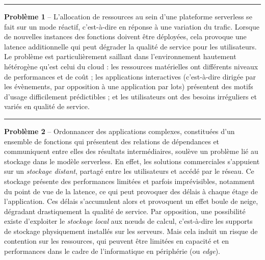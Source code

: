 \begin{center}
    \rule{4cm}{0.4pt}
\end{center}

\textbf{Problème 1} -- L'allocation de ressources au sein d'une plateforme serverless se fait sur un mode réactif, c'est-à-dire en réponse à une variation du trafic. Lorsque de nouvelles instances des fonctions doivent être déployées, cela provoque une latence additionnelle qui peut dégrader la qualité de service pour les utilisateurs. Le problème est particulièrement saillant dans l'environnement hautement hétérogène qu'est celui du cloud : les ressources matérielles ont différents niveaux de performances et de coût ; les applications interactives (c'est-à-dire dirigée par les évènements, par opposition à une application par lots) présentent des motifs d'usage difficilement prédictibles ; et les utilisateurs ont des besoins irréguliers et variés en qualité de service.


\begin{center}
    \rule{4cm}{0.4pt}
\end{center}

\textbf{Problème 2} -- Ordonnancer des applications complexes, constituées d'un ensemble de fonctions qui présentent des relations de dépendances et communiquent entre elles des résultats intermédiaires, soulève un problème lié au stockage dans le modèle serverless. En effet, les solutions commerciales s'appuient sur un \textit{stockage distant}, partagé entre les utilisateurs et accédé par le réseau. Ce stockage présente des performances limitées et parfois imprévisibles, notamment du point de vue de la latence, ce qui peut provoquer des délais à chaque étage de l'application. Ces délais s'accumulent alors et provoquent un effet boule de neige, dégradant drastiquement la qualité de service. Par opposition, une possibilité existe d'exploiter le \textit{stockage local} aux nœuds de calcul, c'est-à-dire les supports de stockage physiquement installés sur les serveurs. Mais cela induit un risque de contention sur les ressources, qui peuvent être limitées en capacité et en performances dans le cadre de l'informatique en périphérie (ou \textit{edge}).

